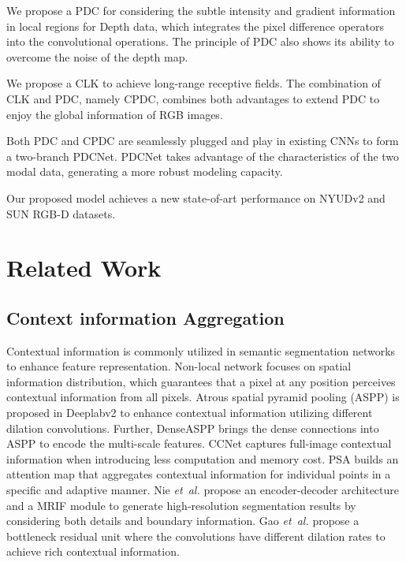 \documentclass[lettersize,journal]{IEEEtran}
\begin{document}
 We propose a PDC for considering the subtle intensity and gradient information in local regions for Depth data, which integrates the pixel difference operators into the convolutional operations. The principle of PDC also shows its ability to overcome the noise of the depth map.

 We propose a CLK to achieve long-range receptive fields. The combination of CLK and PDC, namely CPDC, combines both advantages to extend PDC to enjoy the global information of RGB images.

 Both PDC and CPDC are seamlessly plugged and
play in existing CNNs to form a two-branch PDCNet. \iffalse Each branch of PDCNet is equipped with PDC and CPDC, respectively.\fi PDCNet takes advantage of the characteristics of the two modal data, generating a more robust modeling capacity.


 Our proposed model achieves a new state-of-art performance on NYUDv2 and SUN RGB-D datasets.



\section{Related Work}





\subsection{Context information Aggregation}
Contextual information is commonly utilized in semantic segmentation networks to enhance feature representation. Non-local network \cite{wang2018non} focuses on spatial information distribution, which guarantees that a pixel at any position perceives
contextual information from all pixels. Atrous spatial
pyramid pooling (ASPP) is proposed in Deeplabv2 \cite{chen2017deeplab} to enhance contextual information utilizing different dilation convolutions. Further, DenseASPP \cite{yang2018denseaspp} brings the dense connections into ASPP to encode the multi-scale features. CCNet \cite{huang2019ccnet} captures full-image contextual information when introducing less computation and memory cost. PSA \cite{zhao2018psanet} builds an attention map that aggregates contextual information for individual points in a specific and adaptive manner. Nie \textit{et~al.} \cite{nie2022mign} propose an encoder-decoder architecture and a MRIF module to generate high-resolution segmentation results by considering both details and boundary information. Gao \textit{et~al.} \cite{gao2022fbsnet} propose a bottleneck residual unit where the convolutions have different dilation rates to achieve rich contextual information.
\end{document}
